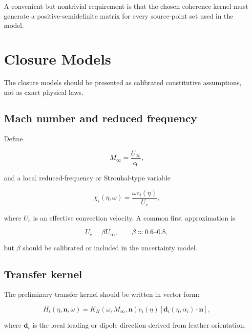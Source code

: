 \documentclass[11pt]{article}
\newcommand{\vect}[1]{\bm{#1}}
\begin{document}
A convenient but nontrivial requirement is that the chosen coherence kernel must generate a positive-semidefinite matrix for every source-point set used in the model.

\section{Closure Models}

The closure models should be presented as calibrated constitutive assumptions, not as exact physical laws.

\subsection{Mach number and reduced frequency}

Define

\begin{equation}
    M_{\infty}=\frac{U_{\infty}}{c_0},
\end{equation}

and a local reduced-frequency or Strouhal-type variable

\begin{equation}
    \chi_i(\eta,\omega)
    =
    \frac{\omega c_i(\eta)}{U_c},
\end{equation}

where $U_c$ is an effective convection velocity. A common first approximation is

\begin{equation}
    U_c = \beta U_{\infty},
    \qquad
    \beta \approx 0.6\text{--}0.8,
\end{equation}

but $\beta$ should be calibrated or included in the uncertainty model.

\subsection{Transfer kernel}

The preliminary transfer kernel should be written in vector form:

\begin{equation}
    H_i(\eta,\vect{n},\omega)
    =
    K_H(\omega,M_{\infty},\vect{n})
    c_i(\eta)
    \left[
        \vect{d}_i(\eta,\alpha_i)\cdot \vect{n}
    \right],
\end{equation}

where $\vect{d}_i$ is the local loading or dipole direction derived from feather orientation.
\end{document}
